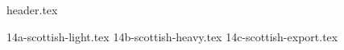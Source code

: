 \clearpage
{}
\divisorLine

{header.tex}

\begin{multicols}{2}

{14a-scottish-light.tex}
{14b-scottish-heavy.tex}
{14c-scottish-export.tex}

\end{multicols}